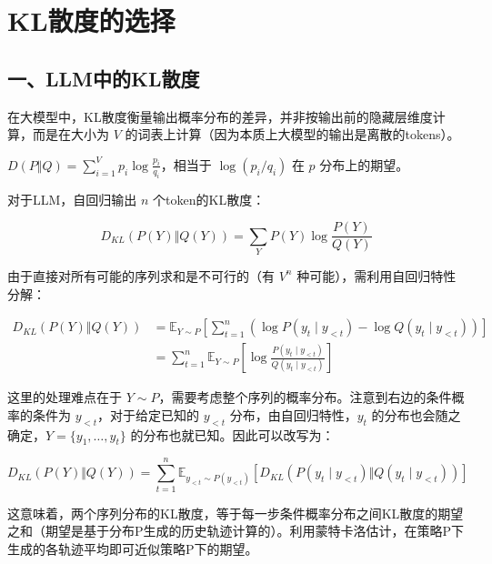 \setcounter{section}{7}

\hypertarget{klux6563ux5ea6ux7684ux9009ux62e9}{%
\section{KL散度的选择}\label{klux6563ux5ea6ux7684ux9009ux62e9}}

\hypertarget{ux4e00llmux4e2dux7684klux6563ux5ea6}{%
\subsection{一、LLM中的KL散度}\label{ux4e00llmux4e2dux7684klux6563ux5ea6}}

在大模型中，KL散度衡量输出概率分布的差异，并非按输出前的隐藏层维度计算，而是在大小为 \(V\) 的词表上计算（因为本质上大模型的输出是离散的tokens）。

\(D(P \Vert Q)=\sum_{i=1}^{V}p_i\log\frac{p_i}{q_i}\)，相当于 \(\log(p_i/q_i)\) 在 \(p\) 分布上的期望。

对于LLM，自回归输出 \(n\) 个token的KL散度：

\[
D_{KL}(P(Y) \Vert Q(Y))=\sum_Y P(Y)\log\frac{P(Y)}{Q(Y)}
\]

由于直接对所有可能的序列求和是不可行的（有 \(V^n\) 种可能），需利用自回归特性分解：

\[
\begin{aligned}
D_{KL}(P(Y) \Vert Q(Y))
&= \mathbb{E}_{Y\sim P}\left[\sum_{t=1}^{n}\left(\log P(y_t\mid y_{<t})-\log Q(y_t\mid y_{<t})\right)\right] \\
&= \sum_{t=1}^{n}\mathbb{E}_{Y\sim P}\left[\log\frac{P(y_t\mid y_{<t})}{Q(y_t\mid y_{<t})}\right]
\end{aligned}
\]

这里的处理难点在于 \(Y\sim P\)，需要考虑整个序列的概率分布。注意到右边的条件概率的条件为 \(y_{<t}\)，对于给定已知的 \(y_{<t}\) 分布，由自回归特性，\(y_t\) 的分布也会随之确定，\(Y=\{y_1,\ldots,y_t\}\) 的分布也就已知。因此可以改写为：

\[
D_{KL}(P(Y) \Vert Q(Y))
=\sum_{t=1}^{n}\mathbb{E}_{y_{<t}\sim P(y_{<t})}\left[
D_{KL}\left(P(y_t\mid y_{<t}) \Vert Q(y_t\mid y_{<t})\right)
\right]
\]

这意味着，两个序列分布的KL散度，等于每一步条件概率分布之间KL散度的期望之和（期望是基于分布P生成的历史轨迹计算的）。利用蒙特卡洛估计，在策略P下生成的各轨迹平均即可近似策略P下的期望。

